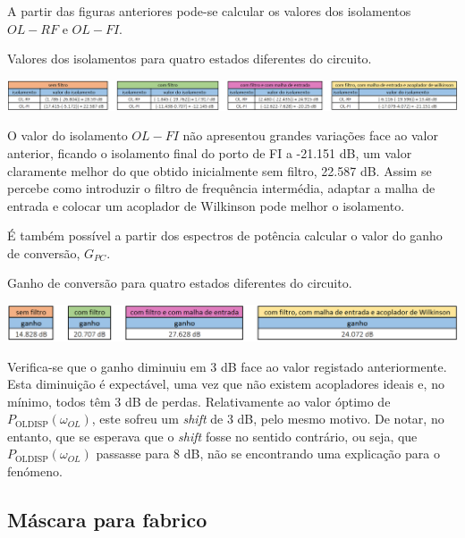 \documentclass[11pt]{article}
\numberwithin{equation}{section}
\begin{document}
A partir das figuras anteriores pode-se calcular os valores dos isolamentos $OL - RF$ e $OL - FI$. 

\begin{table}[h]
	\centering
	\caption{Valores dos isolamentos para quatro estados diferentes do circuito.}
	\vspace{-1.5mm}
	\includegraphics[keepaspectratio=true, scale=0.34]{teoricas/isolamentosSemComFiltroMalhaAcop}
\end{table}

O valor do isolamento $OL - FI$ não apresentou grandes variações face ao valor anterior, ficando o isolamento final do porto de FI a -21.151 dB, um valor claramente melhor do que obtido inicialmente sem filtro, 22.587 dB. Assim se percebe como introduzir o filtro de frequência intermédia, adaptar a malha de entrada e colocar um acoplador de Wilkinson pode melhor o isolamento.

É também possível a partir dos espectros de potência calcular o valor do ganho de conversão, $G_{PC}$.

\begin{table}[h]
	\centering
	\caption{Ganho de conversão para quatro estados diferentes do circuito.}
	\vspace{-1.5mm}
	\includegraphics[keepaspectratio=true, scale=0.40]{teoricas/ganhoSemComFiltroMalhaAcop}
\end{table}

Verifica-se que o ganho diminuiu em 3 dB face ao valor registado anteriormente. Esta diminuição é expectável, uma vez que não existem acopladores ideais e, no mínimo, todos têm 3 dB de perdas. Relativamente ao valor óptimo de $ P_{\text{OLDISP}}\left(\omega_{OL}\right) $, este sofreu um \textit{shift} de 3 dB, pelo mesmo motivo. De notar, no entanto, que se esperava que o \textit{shift} fosse no sentido contrário, ou seja, que $ P_{\text{OLDISP}}\left(\omega_{OL}\right) $ passasse para 8 dB, não se encontrando uma explicação para o fenómeno. 

\subsection{Máscara para fabrico}
\end{document}
